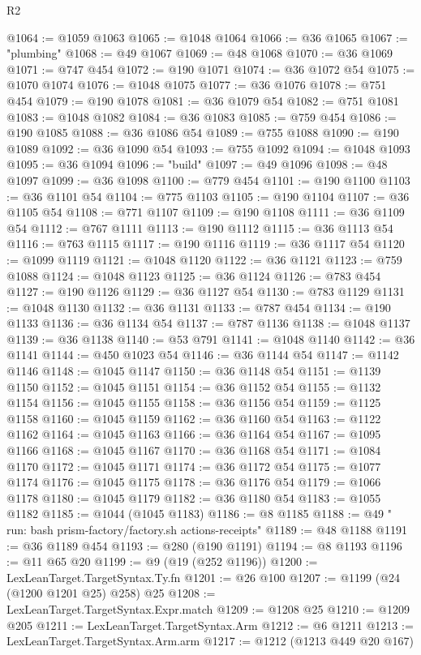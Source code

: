 \begin{lexlean}{R2}
\begin{coremodule}
@1064 := @1059 @1063
@1065 := @1048 @1064
@1066 := @36 @1065
@1067 := "plumbing"
@1068 := @49 @1067
@1069 := @48 @1068
@1070 := @36 @1069
@1071 := @747 @454
@1072 := @190 @1071
@1074 := @36 @1072 @54
@1075 := @1070 @1074
@1076 := @1048 @1075
@1077 := @36 @1076
@1078 := @751 @454
@1079 := @190 @1078
@1081 := @36 @1079 @54
@1082 := @751 @1081
@1083 := @1048 @1082
@1084 := @36 @1083
@1085 := @759 @454
@1086 := @190 @1085
@1088 := @36 @1086 @54
@1089 := @755 @1088
@1090 := @190 @1089
@1092 := @36 @1090 @54
@1093 := @755 @1092
@1094 := @1048 @1093
@1095 := @36 @1094
@1096 := "build"
@1097 := @49 @1096
@1098 := @48 @1097
@1099 := @36 @1098
@1100 := @779 @454
@1101 := @190 @1100
@1103 := @36 @1101 @54
@1104 := @775 @1103
@1105 := @190 @1104
@1107 := @36 @1105 @54
@1108 := @771 @1107
@1109 := @190 @1108
@1111 := @36 @1109 @54
@1112 := @767 @1111
@1113 := @190 @1112
@1115 := @36 @1113 @54
@1116 := @763 @1115
@1117 := @190 @1116
@1119 := @36 @1117 @54
@1120 := @1099 @1119
@1121 := @1048 @1120
@1122 := @36 @1121
@1123 := @759 @1088
@1124 := @1048 @1123
@1125 := @36 @1124
@1126 := @783 @454
@1127 := @190 @1126
@1129 := @36 @1127 @54
@1130 := @783 @1129
@1131 := @1048 @1130
@1132 := @36 @1131
@1133 := @787 @454
@1134 := @190 @1133
@1136 := @36 @1134 @54
@1137 := @787 @1136
@1138 := @1048 @1137
@1139 := @36 @1138
@1140 := @53 @791
@1141 := @1048 @1140
@1142 := @36 @1141
@1144 := @450 @1023 @54
@1146 := @36 @1144 @54
@1147 := @1142 @1146
@1148 := @1045 @1147
@1150 := @36 @1148 @54
@1151 := @1139 @1150
@1152 := @1045 @1151
@1154 := @36 @1152 @54
@1155 := @1132 @1154
@1156 := @1045 @1155
@1158 := @36 @1156 @54
@1159 := @1125 @1158
@1160 := @1045 @1159
@1162 := @36 @1160 @54
@1163 := @1122 @1162
@1164 := @1045 @1163
@1166 := @36 @1164 @54
@1167 := @1095 @1166
@1168 := @1045 @1167
@1170 := @36 @1168 @54
@1171 := @1084 @1170
@1172 := @1045 @1171
@1174 := @36 @1172 @54
@1175 := @1077 @1174
@1176 := @1045 @1175
@1178 := @36 @1176 @54
@1179 := @1066 @1178
@1180 := @1045 @1179
@1182 := @36 @1180 @54
@1183 := @1055 @1182
@1185 := @1044 (@1045 @1183)
@1186 := @8 @1185
@1188 := @49 "        run: bash prism-factory/factory.sh actions-receipts"
@1189 := @48 @1188
@1191 := @36 @1189 @454
@1193 := @280 (@190 @1191)
@1194 := @8 @1193
@1196 := @11 @65 @20
@1199 := @9 (@19 (@252 @1196))
@1200 := LexLeanTarget.TargetSyntax.Ty.fn
@1201 := @26 @100
@1207 := @1199 (@24 (@1200 @1201 @25) @258) @25
@1208 := LexLeanTarget.TargetSyntax.Expr.match
@1209 := @1208 @25
@1210 := @1209 @205
@1211 := LexLeanTarget.TargetSyntax.Arm
@1212 := @6 @1211
@1213 := LexLeanTarget.TargetSyntax.Arm.arm
@1217 := @1212 (@1213 @449 @20 @167)

\end{coremodule}
\end{lexlean}
